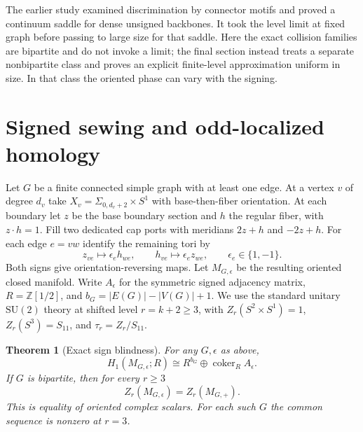 \documentclass[11pt]{article}
\newtheorem{theorem}{Theorem}[section]
\theoremstyle{remark}
\DeclareMathOperator{\coker}{coker}
\newcommand{\SU}{\mathrm{SU}}
\begin{document}
The earlier study \cite{P50} examined discrimination by connector motifs and proved a continuum saddle for dense unsigned backbones. It took the level limit at fixed graph before passing to large size for that saddle. Here the exact collision families are bipartite and do not invoke a limit; the final section instead treats a separate nonbipartite class and proves an explicit finite-level approximation uniform in size. In that class the oriented phase can vary with the signing.

\section{Signed sewing and odd-localized homology}
\label{sec:signed}
Let \(G\) be a finite connected simple graph with at least one edge. At a vertex \(v\) of degree \(d_v\) take \(X_v=\Sigma_{0,d_v+2}\times S^1\) with base-then-fiber orientation. At each boundary let \(z\) be the base boundary section and \(h\) the regular fiber, with \(z\cdot h=1\). Fill two dedicated cap ports with meridians \(2z+h\) and \(-2z+h\). For each edge \(e=vw\) identify the remaining tori by
\[
        z_{ve}\longmapsto\epsilon_e h_{we},
       \qquad h_{ve}\longmapsto\epsilon_e z_{we},
       \qquad \epsilon_e\in\{1,-1\}.
\]
Both signs give orientation-reversing maps. Let \(M_{G,\epsilon}\) be the resulting oriented closed manifold. Write \(A_\epsilon\) for the symmetric signed adjacency matrix, \(R=\mathbb Z[1/2]\), and \(b_G=|E(G)|-|V(G)|+1\). We use the standard unitary \(\SU(2)\) theory at shifted level \(r=k+2\ge3\), with \(Z_r(S^2\times S^1)=1\), \(Z_r(S^3)=S_{11}\), and \(\tau_r=Z_r/S_{11}\).

\begin{theorem}[Exact sign blindness]
\label{thm:main}
For any \(G,\epsilon\) as above,
\begin{equation}
 H_1(M_{G,\epsilon};R)\cong R^{b_G}\oplus\coker_R A_\epsilon .
 \label{eq:hom}
\end{equation}
If \(G\) is bipartite, then for every \(r\ge3\)
\begin{equation}
 Z_r(M_{G,\epsilon})=Z_r(M_{G,+}).
 \label{eq:collision}
\end{equation}
This is equality of oriented complex scalars. For each such \(G\) the common sequence is nonzero at \(r=3\).
\end{theorem}
\end{document}
